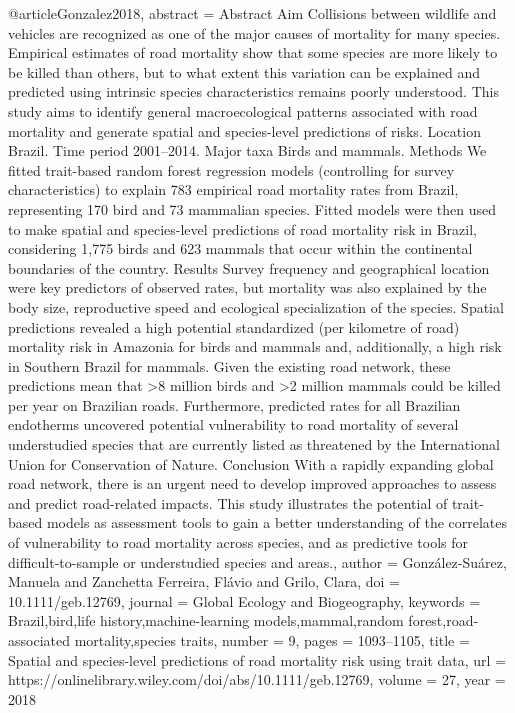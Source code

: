{{{{{@article{Gonzalez2018,
abstract = {Abstract Aim Collisions between wildlife and vehicles are recognized as one of the major causes of mortality for many species. Empirical estimates of road mortality show that some species are more likely to be killed than others, but to what extent this variation can be explained and predicted using intrinsic species characteristics remains poorly understood. This study aims to identify general macroecological patterns associated with road mortality and generate spatial and species-level predictions of risks. Location Brazil. Time period 2001–2014. Major taxa Birds and mammals. Methods We fitted trait-based random forest regression models (controlling for survey characteristics) to explain 783 empirical road mortality rates from Brazil, representing 170 bird and 73 mammalian species. Fitted models were then used to make spatial and species-level predictions of road mortality risk in Brazil, considering 1,775 birds and 623 mammals that occur within the continental boundaries of the country. Results Survey frequency and geographical location were key predictors of observed rates, but mortality was also explained by the body size, reproductive speed and ecological specialization of the species. Spatial predictions revealed a high potential standardized (per kilometre of road) mortality risk in Amazonia for birds and mammals and, additionally, a high risk in Southern Brazil for mammals. Given the existing road network, these predictions mean that >8 million birds and >2 million mammals could be killed per year on Brazilian roads. Furthermore, predicted rates for all Brazilian endotherms uncovered potential vulnerability to road mortality of several understudied species that are currently listed as threatened by the International Union for Conservation of Nature. Conclusion With a rapidly expanding global road network, there is an urgent need to develop improved approaches to assess and predict road-related impacts. This study illustrates the potential of trait-based models as assessment tools to gain a better understanding of the correlates of vulnerability to road mortality across species, and as predictive tools for difficult-to-sample or understudied species and areas.},
author = {Gonz{\'{a}}lez-Su{\'{a}}rez, Manuela and {Zanchetta Ferreira}, Fl{\'{a}}vio and Grilo, Clara},
doi = {10.1111/geb.12769},
journal = {Global Ecology and Biogeography},
keywords = {Brazil,bird,life history,machine-learning models,mammal,random forest,road-associated mortality,species traits},
number = {9},
pages = {1093--1105},
title = {{Spatial and species-level predictions of road mortality risk using trait data}},
url = {https://onlinelibrary.wiley.com/doi/abs/10.1111/geb.12769},
volume = {27},
year = {2018}
}

}}}}}
